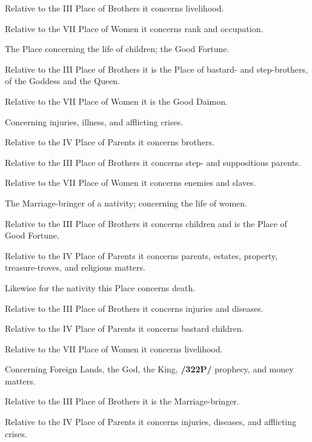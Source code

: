 \begin{description}[labelindent=0em , labelwidth=1em, labelsep=1em, leftmargin =!]
	Relative to the III Place of Brothers it concerns livelihood. 
	
	Relative to the VII Place of Women it concerns rank and occupation. 

\item[V.] 
	The Place concerning the life of children; the Good Fortune. 
	
	Relative to the III Place of Brothers it is the Place of bastard- and step-brothers, of the Goddess and the Queen. 
	
	Relative to the VII Place of Women it is the Good Daimon.
	
\item[VI.] 
	Concerning injuries, illness, and afflicting crises. 
	
	Relative to the IV Place of Parents it concerns brothers. 
	
	Relative to the III Place of Brothers it concerns step- and suppositious parents. 
	
	Relative to the VII Place of Women it concerns enemies and slaves.

\item[VII.] 
	 The Marriage-bringer of a nativity; concerning the life of women. 
	 
	 Relative to the III Place of Brothers it concerns children and is the Place of Good Fortune. 
	 
	 Relative to the IV Place of Parents it concerns parents, estates, property, treasure-troves, and religious matters.
	 
\item[VIII.] 
	 Likewise for the nativity this Place concerns death. 
	 
	 Relative to the III Place of Brothers it concerns injuries and diseases. 
	 
	 Relative to the IV Place of Parents it concerns bastard children. 
	 
	 Relative to the VII Place of Women it concerns livelihood.
	 
\item[IX.] 
	 Concerning Foreign Lands, the God, the King, \textbf{/322P/} prophecy, and money matters. 
	 
	 Relative to the III Place of Brothers it is the Marriage-bringer. 
	 
	 Relative to the IV Place of Parents it concerns injuries, diseases, and afflicting crises. 
	 

\end{description}
